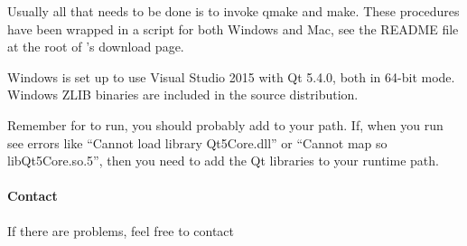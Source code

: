 Usually all that needs to be done is to invoke qmake and make. These procedures
have been wrapped in a script for both Windows and Mac, see the README file at
the root of \map{}'s download page.

Windows is set up to use Visual Studio 2015 with Qt 5.4.0, both in 64-bit mode.
Windows ZLIB binaries are included in the source distribution.

Remember for \map{} to run, you should probably add \map{} to your path.
If, when you run \map{} see errors like ``Cannot load library Qt5Core.dll''
or ``Cannot map so libQt5Core.so.5'', then you need to add the Qt libraries
to your runtime path.

\paragraph{Contact}
If there are problems, feel free to contact

